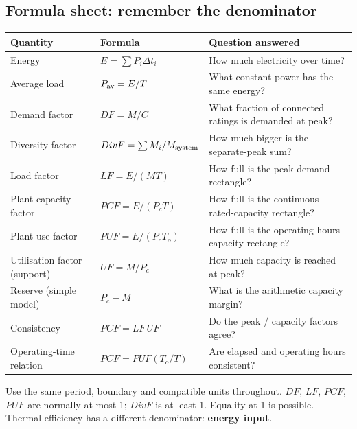 \documentclass[11pt,a4paper]{article}
\begin{document}
\subsection{Formula sheet: remember the denominator}
\begin{center}\small
\begin{tabularx}{\textwidth}{L{3.8cm}L{4.8cm}Y}
\toprule\textbf{Quantity} & \textbf{Formula} & \textbf{Question answered}\\\midrule
Energy & $E=\sum P_i\Delta t_i$ & How much electricity over time?\\
Average load & $P_{\rm av}=E / T$ & What constant power has the same energy?\\
Demand factor & $DF=M / C$ & What fraction of connected ratings is demanded at peak?\\
Diversity factor & $DivF=\sum M_i / M_{\rm system}$ & How much bigger is the separate-peak sum?\\
Load factor & $LF=E/(MT)$ & How full is the peak-demand rectangle?\\
Plant capacity factor & $PCF=E/(P_cT)$ & How full is the continuous rated-capacity rectangle?\\
Plant use factor & $PUF=E/(P_cT_o)$ & How full is the operating-hours capacity rectangle?\\
Utilisation factor (support) & $UF=M / P_c$ & How much capacity is reached at peak?\\
Reserve (simple model) & $P_c-M$ & What is the arithmetic capacity margin?\\
Consistency & $PCF=LF\,UF$ & Do the peak / capacity factors agree?\\
Operating-time relation & $PCF=PUF(T_o / T)$ & Are elapsed and operating hours consistent?\\\bottomrule
\end{tabularx}\end{center}
Use the same period, boundary and compatible units throughout. $DF$, $LF$, $PCF$, $PUF$ are normally at most 1; $DivF$ is at least 1. Equality at 1 is possible. Thermal efficiency has a different denominator: \textbf{energy input}.
\end{document}
